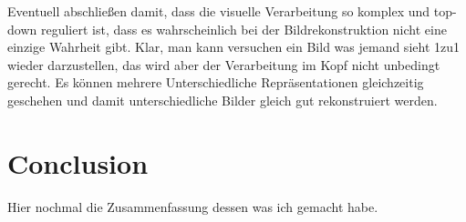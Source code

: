 Eventuell abschließen damit, dass die visuelle Verarbeitung so komplex und top-down reguliert ist, dass es wahrscheinlich bei der Bildrekonstruktion nicht eine einzige Wahrheit gibt. Klar, man kann versuchen ein Bild was jemand sieht 1zu1 wieder darzustellen, das wird aber der Verarbeitung im Kopf nicht unbedingt gerecht. Es können mehrere Unterschiedliche Repräsentationen gleichzeitig geschehen und damit unterschiedliche Bilder gleich gut rekonstruiert werden. 


\section{Conclusion}
Hier nochmal die Zusammenfassung dessen was ich gemacht habe. 


